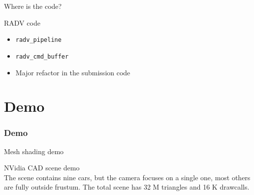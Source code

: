 \documentclass[aspectratio=169,t,xcolor=table]{beamer}
\begin{document}
\begin{frame}{Where is the code?}

    \LARGE
    RADV code
    
    \begin{itemize}
      \item \texttt{radv\_pipeline}
      \item \texttt{radv\_cmd\_buffer}
      \item Major refactor in the submission code
    \end{itemize}

\end{frame}

\section{Demo}

\begin{frame}{}
    \frametitle{Demo}
\end{frame}

\begin{frame}{Mesh shading demo}

    \LARGE

    NVidia CAD scene demo \\
    The scene contains nine cars, but the camera focuses on a single one,
    most others are fully outside frustum. The total scene has 32 M triangles and 16 K drawcalls.

\end{frame}
\end{document}
